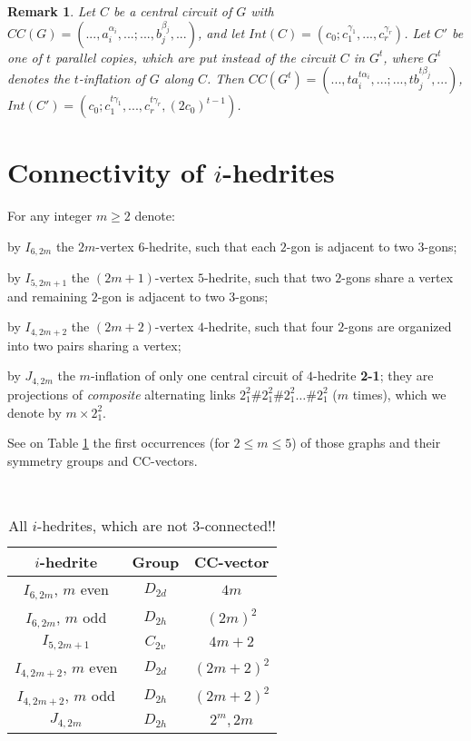 \documentclass[12pt]{article}
\newtheorem{remark}{Remark}
\begin{document}
\begin{remark}

Let $C$ be a central circuit of $G$ with $CC(G)=(...,a_i^{\alpha_i},...;...,b_j^{\beta_j},...)$,  and let 
$Int(C)=(c_0;c_1^{\gamma_1},...,c_r^{\gamma_r})$. Let $C'$ be one of 
$t$ parallel copies, which are put instead of the circuit $C$ in 
$G^t$, where $G^t$ denotes the $t$-inflation of $G$ along $C$.
Then $CC(G^t)=(...,ta_i^{t\alpha_i},...;...,tb_j^{t\beta_j},...)$,
$Int(C')=(c_0;c_1^{t\gamma_1},...,c_r^{t\gamma_r}, (2c_0)^{t-1})$.
\end{remark}


\section{Connectivity of $i$-hedrites}
For any integer $m\geq 2$ denote:

by $I_{6,2m}$ the $2m$-vertex $6$-hedrite, such that each $2$-gon is adjacent to two $3$-gons;

by $I_{5,2m+1}$ the $(2m+1)$-vertex $5$-hedrite, such that 
two $2$-gons share a vertex and remaining $2$-gon is adjacent
to two $3$-gons;

by $I_{4,2m+2}$ the $(2m+2)$-vertex $4$-hedrite, such that 
four $2$-gons are organized into two pairs sharing a vertex; 

by $J_{4,2m}$ the $m$-inflation of only one central circuit of
$4$-hedrite {\bf 2-1}; they are projections of {\em composite}
alternating links $2^2_1\#2^2_1\#2^2_1\dots\#2^2_1$ ($m$ times),
which we denote by $m\times 2^2_1$.

See on Table \ref{FundamentalInfo} the first occurrences 
(for $2\leq m\leq 5$) of those graphs and their symmetry 
groups and CC-vectors.

\begin{table}
\centering
\epsfxsize=100mm
\\[2mm]
\begin{tabular}{||c|c|c||}
\hline\hline
$i$-hedrite            &Group      &CC-vector\\\hline\hline
$I_{6,2m}$, $m$ even   &$D_{2d}$   &$4m$\\\hline
$I_{6,2m}$, $m$ odd    &$D_{2h}$   &$(2m)^2$\\\hline
$I_{5,2m+1}$           &$C_{2v}$   &$4m+2$\\\hline
$I_{4,2m+2}$, $m$ even &$D_{2d}$   &$(2m+2)^2$\\\hline
$I_{4,2m+2}$, $m$ odd  &$D_{2h}$   &$(2m+2)^2$\\\hline
$J_{4,2m}$             &$D_{2h}$   &$2^m, 2m$\\\hline\hline
\end{tabular}
\caption{All $i$-hedrites, which are not $3$-connected!!}
\label{FundamentalInfo}
\end{table}
\end{document}
